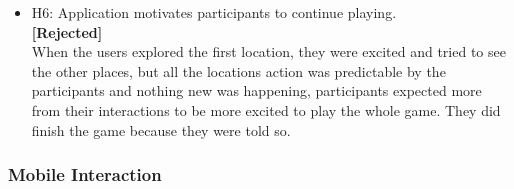\begin{itemize}
\item H6: Application motivates participants to continue playing. \\ 
\textbf{[Rejected]}\\
When the users explored the first location, they were excited and tried to see the other places, but all the locations action was predictable by the participants and nothing new was happening, participants expected more from their interactions to be more excited to play the whole game. They did finish the game because they were told so.

\end{itemize}


\subsubsection {Mobile Interaction}
